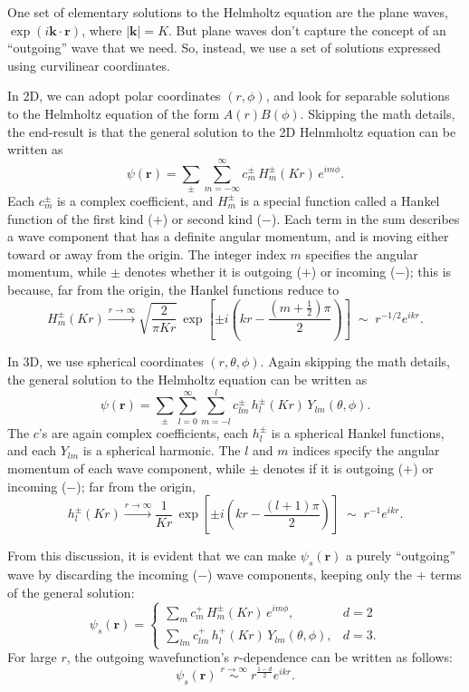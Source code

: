 \documentclass[pra,11pt]{revtex4}
\begin{document}
One set of elementary solutions to the Helmholtz equation are the
plane waves, $\exp(i\mathbf{k}\cdot\mathbf{r})$, where $|\mathbf{k}| =
K$.  But plane waves don't capture the concept of an ``outgoing'' wave
that we need.  So, instead, we use a set of solutions expressed using
curvilinear coordinates.

In 2D, we can adopt polar coordinates $(r,\phi)$, and look for
separable solutions to the Helmholtz equation of the form
$A(r)B(\phi)$.  Skipping the math details, the end-result is that the
general solution to the 2D Helnmholtz equation can be written as
$$\psi(\mathbf{r})=\sum_{\pm}\sum_{m=-\infty}^\infty c_m^\pm\,H_m^\pm(Kr)\,e^{im\phi}.$$
Each $c_m^\pm$ is a complex coefficient, and $H_m^\pm$ is a special
function called a Hankel function of the first kind ($+$) or second
kind ($-$).  Each term in the sum describes a wave component that has a
definite angular momentum, and is moving either toward or away from the
origin.  The integer index $m$ specifies the angular momentum, while
$\pm$ denotes whether it is outgoing ($+$) or incoming ($-$); this is
because, far from the origin, the Hankel functions reduce to
$$H_m^\pm(Kr) \overset{r\rightarrow\infty}{\longrightarrow} \sqrt{\frac{2}{\pi Kr}} \, \exp\left[\pm i\left(kr - \frac{(m+\frac{1}{2})\pi}{2}\right)\right] \;\sim\; r^{-1/2} e^{ikr}.$$

In 3D, we use spherical coordinates $(r,\theta,\phi)$.  Again skipping
the math details, the general solution to the Helmholtz equation can
be written as
$$\psi(\mathbf{r})=\sum_{\pm}\sum_{l=0}^\infty\sum_{m=-l}^lc_{lm}^\pm\,h_l^\pm(Kr)\,Y_{lm}(\theta,\phi).$$
The $c$'s are again complex coefficients, each $h_l^\pm$ is a
spherical Hankel functions, and each $Y_{lm}$ is a spherical harmonic.
The $l$ and $m$ indices specify the angular momentum of each wave
component, while $\pm$ denotes if it is outgoing ($+$) or incoming
($-$); far from the origin,
$$h_l^\pm(Kr) \overset{r\rightarrow\infty}{\longrightarrow} \frac{1}{Kr}\,\exp\left[\pm i\left(kr-\frac{(l+1)\pi}{2}\right)\right] \;\sim\; r^{-1} e^{ikr}.$$

From this discussion, it is evident that we can make
$\psi_s(\mathbf{r})$ a purely ``outgoing'' wave by discarding the
incoming ($-$) wave components, keeping only the $+$ terms of the
general solution:
$$\psi_s(\mathbf{r}) = \begin{cases} \displaystyle\sum_{m} c_m^+\,H_m^\pm(Kr)\,e^{im\phi}, &d=2\\ \displaystyle\sum_{lm} c_{lm}^+\,h_l^+(Kr)\,Y_{lm}(\theta,\phi),&d=3.\end{cases}$$
For large $r$, the outgoing wavefunction's $r$-dependence can be
written as follows:
$$\psi_s(\mathbf{r}) \; \overset{r\rightarrow\infty}{\sim} \; r^{\frac{1-d}{2}} e^{ikr}.$$
\end{document}
